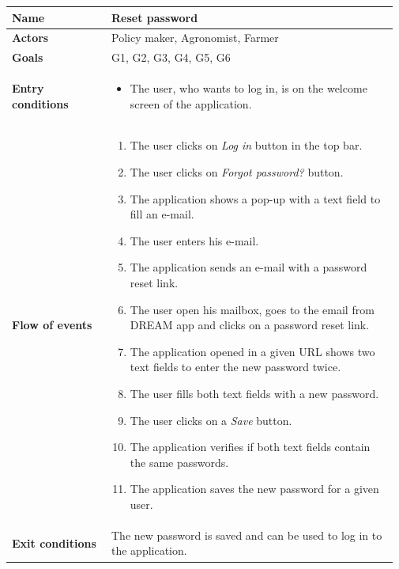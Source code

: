\begin{longtable}{@{}p{0.25\linewidth} p{0.72\linewidth}@{}}
\toprule
	\textbf{Name}               & Reset password\\
	\midrule
	\textbf{Actors}             & Policy maker, Agronomist, Farmer\\
	\midrule
	\textbf{Goals}              & G1, G2, G3, G4, G5, G6 \\
	\midrule
	
	\textbf{Entry conditions}   & \begin{itemize}[leftmargin=.4cm,noitemsep,topsep=0pt,before=\vspace{-3mm},after=\vspace{-4mm}]
	    \item The user, who wants to log in, is on the welcome screen of the application.
	\end{itemize}\\
	\midrule
	
	\textbf{Flow of events}     & \begin{enumerate}[leftmargin=.4cm,noitemsep,topsep=0pt,before=\vspace{-3mm},after=\vspace{-4mm}]
	    \item The user clicks on \textit{Log in} button in the top bar.
	    \item The user clicks on \textit{Forgot password?} button.
	    \item The application shows a pop-up with a text field to fill an e-mail.
	    \item The user enters his e-mail.
	    \item The application sends an e-mail with a password reset link.
	    \item The user open his mailbox, goes to the email from DREAM app and clicks on a password reset link.
	    \item The application opened in a given URL shows two text fields to enter the new password twice.
	    \item The user fills both text fields with a new password.
	    \item The user clicks on a \textit{Save} button.
	    \item The application verifies if both text fields contain the same passwords.
	    \item The application saves the new password for a given user.
	\end{enumerate}\\
	\midrule
	\textbf{Exit conditions}    & The new password is saved and can be used to log in to the application.
	\\ \midrule
	

\end{longtable}
